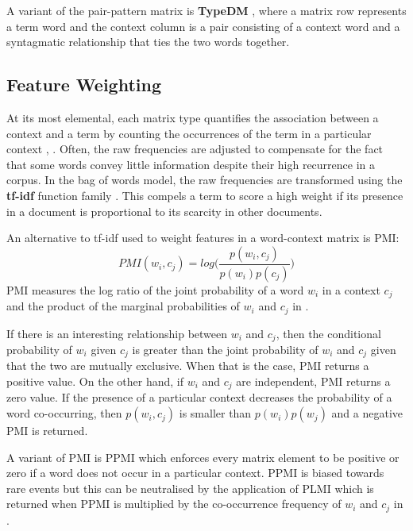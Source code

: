A variant of the pair-pattern matrix is \textbf{TypeDM} \citep{roller2014inclusive}, where a matrix row represents a term word and the context column is a pair consisting of a context word and a syntagmatic relationship that ties the two words together.

\subsection{Feature Weighting}
At its most elemental, each matrix type quantifies the association between a context and a term by counting the occurrences of the term in a particular context \citep{turney2010frequency}, \citep{shwartz2017siege}.  Often, the raw frequencies are adjusted to compensate for the fact that some words convey little information despite their high recurrence in a corpus.  In the bag of words model, the raw frequencies are transformed using the \textbf{\ac{tf-idf}} function family \citep{turney2010frequency}.  This compels a term to score a high weight if its presence in a document is proportional to its scarcity in other documents.

An alternative to \ac{tf-idf} used to weight features in a word-context matrix is \ac{PMI}:
\[PMI(w_i, c_j) = log \Bigg( \frac{p(w_i, c_j)}{p(w_i)p(c_j)} \Bigg) \]
\ac{PMI} measures the log ratio of the joint probability of a word $w_i$ in a context $c_j$ and the product of the marginal probabilities of $w_i$ and $c_j$ \citep{church1990word} in \citep{turney2010frequency, shwartz2017siege}.

If there is an interesting relationship between $w_i$ and $c_j$, then the conditional probability of $w_i$ given $c_j$ is greater than the joint probability of $w_i$ and $c_j$ given that the two are mutually exclusive.  When that is the case, \ac{PMI} returns a positive value.  On the other hand, if $w_i$ and $c_j$ are independent, \ac{PMI} returns a zero value.  If the presence of a particular context decreases the probability of a word co-occurring, then $p(w_i, c_j)$ is smaller than $p(w_i)p(w_j)$ and a negative \ac{PMI} is returned.

A variant of \ac{PMI} is \ac{PPMI} which enforces every matrix element to be positive or zero if a word does not occur in a particular context.  \ac{PPMI} is biased towards rare events \citep{turney2010frequency} but this can be neutralised by the application of \ac{PLMI} which is returned when \ac{PPMI} is multiplied by the co-occurrence frequency of $w_i$ and $c_j$ \citep{evert2008corpora} in \citep{shwartz2017siege}.

